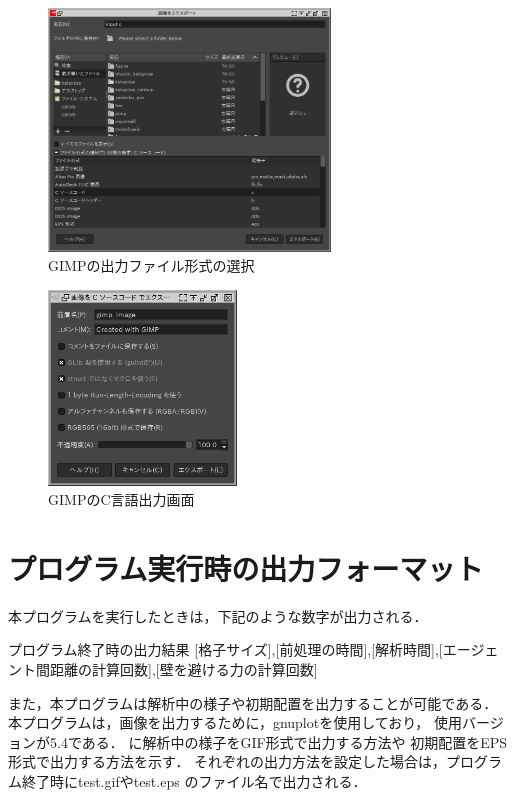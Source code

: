 \begin{figure}[t]
  \begin{center}
    \includegraphics[width=7.5cm,clip]{figure/gimp1.png}
    \caption{GIMPの出力ファイル形式の選択}
    \label{fig:gimp1}
  \end{center}
\end{figure}


\begin{figure}[t]
  \begin{center}
    \includegraphics[width=5cm,clip]{figure/gimp2.png}
    \caption{GIMPのC言語出力画面}
    \label{fig:gimp2}
  \end{center}
\end{figure}

\section{プログラム実行時の出力フォーマット}
本プログラムを実行したときは，下記のような数字が出力される．
%
\begin{itembox}[l]{プログラム終了時の出力結果}
[格子サイズ],[前処理の時間],[解析時間],[エージェント間距離の計算回数],[壁を避ける力の計算回数]
\end{itembox}
%
また，本プログラムは解析中の様子や初期配置を出力することが可能である．
本プログラムは，画像を出力するために，gnuplotを使用しており，
使用バージョンが5.4である．
に解析中の様子をGIF形式で出力する方法や
初期配置をEPS形式で出力する方法を示す．
それぞれの出力方法を設定した場合は，プログラム終了時にtest.gifやtest.eps
のファイル名で出力される．

